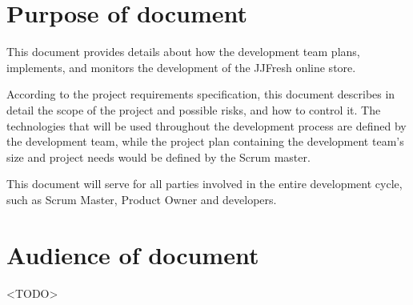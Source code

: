 \documentclass{report}
\begin{document}
\section{Purpose of document}
   This document provides details about how the development team plans, implements, and monitors the development of the JJFresh online store. 

   According to the project requirements specification, this document describes in detail the scope of the project and possible risks, and how to control it. The technologies that will be used throughout the development process are defined by the development team, while the project plan containing the development team's size and project needs would be defined by the Scrum master.

   This document will serve for all parties involved in the entire development cycle, such as Scrum Master, Product Owner and developers.

\section{Audience of document}
\label{sec:audienceOfDocument}
<TODO>
\end{document}

